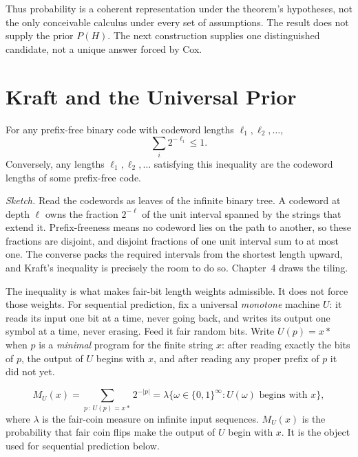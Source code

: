 Thus probability is a coherent representation under the theorem's hypotheses, not the only conceivable calculus under every set of assumptions. The result does not supply the prior $P(H)$. The next construction supplies one distinguished candidate, not a unique answer forced by Cox.

\section*{Kraft and the Universal Prior}

\begin{theorem}[Kraft]
For any prefix-free binary code with codeword lengths $\ell_1, \ell_2, \ldots$,
$$\sum_i 2^{-\ell_i} \le 1.$$
Conversely, any lengths $\ell_1, \ell_2, \ldots$ satisfying this inequality are the codeword lengths of some prefix-free code.
\end{theorem}

\emph{Sketch.} Read the codewords as leaves of the infinite binary tree. A codeword at depth $\ell$ owns the fraction $2^{-\ell}$ of the unit interval spanned by the strings that extend it. Prefix-freeness means no codeword lies on the path to another, so these fractions are disjoint, and disjoint fractions of one unit interval sum to at most one. The converse packs the required intervals from the shortest length upward, and Kraft's inequality is precisely the room to do so. Chapter~4 draws the tiling.

The inequality is what makes fair-bit length weights admissible. It does not force those weights. For sequential prediction, fix a universal \emph{monotone} machine $U$: it reads its input one bit at a time, never going back, and writes its output one symbol at a time, never erasing. Feed it fair random bits. Write $U(p) = x{*}$ when $p$ is a \emph{minimal} program for the finite string $x$: after reading exactly the bits of $p$, the output of $U$ begins with $x$, and after reading any proper prefix of $p$ it did not yet.

\begin{definition}
$$M_U(x) = \sum_{p\, :\, U(p) = x{*}} 2^{-|p|} = \lambda\bigl\{\omega \in \{0,1\}^{\infty} : U(\omega) \text{ begins with } x\bigr\},$$
where $\lambda$ is the fair-coin measure on infinite input sequences. $M_U(x)$ is the probability that fair coin flips make the output of $U$ begin with $x$. It is the object used for sequential prediction below.
\end{definition}

